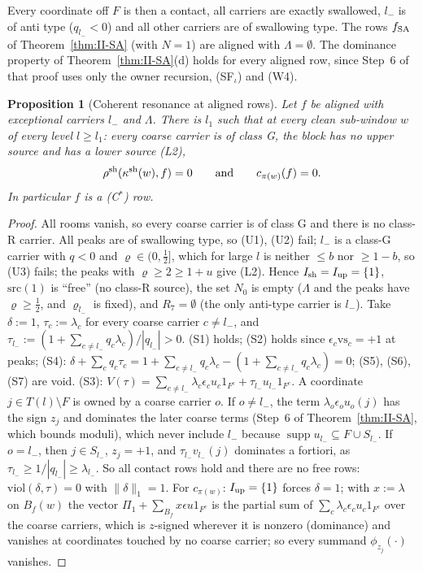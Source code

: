 \documentclass[10pt]{amsart}
\newtheorem{proposition}[theorem]{Proposition}
\theoremstyle{definition}
\theoremstyle{remark}
\newcommand{\supp}{\operatorname{supp}}
\begin{document}
Every coordinate off $F$ is then a contact, all carriers are exactly swallowed,
$l_-$ is of anti type ($q_{l_-}<0$) and all other carriers are of swallowing type.
The rows $f_{\rm SA}$ of Theorem~\ref{thm:II-SA} (with $N=1$) are aligned with
$\Lambda=\emptyset$.  The dominance property of Theorem~\ref{thm:II-SA}(d) holds for
every aligned row, since Step~6 of that proof uses only the owner recursion,
(SF$_\iota$) and (W4).

\begin{proposition}[Coherent resonance at aligned rows]\label{prop:II-alignedres}
Let $f$ be aligned with exceptional carriers $l_-$ and $\Lambda$.  There is $l_1$ such that
at every clean sub-window $w$ of every level $l\ge l_1$: every coarse carrier is of
class G, the block has no upper source and has a lower source \textup{(L2)},
\[
 \rho^{\rm sh}(\kappa^{\rm sh}(w),f)=0\qquad\text{and}\qquad c_{\pi(w)}(f)=0 .
\]
In particular $f$ is a \textup{(C$^*$)} row.
\end{proposition}

\begin{proof}
All rooms vanish, so every coarse carrier is of class G and there is no class-R
carrier.  All peaks are of swallowing type, so (U1), (U2) fail; $l_-$ is a class-G
carrier with $q<0$ and $\varrho\in(0,\frac12]$, which for large $l$ is neither $\le b$
nor $\ge1-b$, so (U3) fails; the peaks with $\varrho\ge2\ge1+u$ give (L2).  Hence
$I_{\rm sh}=I_{\rm up}=\{1\}$, $\mathrm{src}(1)$ is ``free'' (no class-R source), the
set $N_0$ is empty ($\Lambda$ and the peaks have $\varrho\ge\frac12$, and $\varrho_{l_-}$ is fixed),
and $R_7=\emptyset$ (the only anti-type carrier is $l_-$).  Take $\delta:=1$,
$\tau_c:=\lambda_c$ for every coarse carrier $c\ne l_-$, and $\tau_{l_-}:=(1+\sum_{c\ne l_-}
q_c\lambda_c)/|q_{l_-}|>0$.  (S1) holds; (S2) holds since $\epsilon_c\mathrm{vs}_c=+1$ at peaks;
(S4): $\delta+\sum_cq_c\tau_c=1+\sum_{c\ne l_-}q_c\lambda_c-(1+\sum_{c\ne l_-}q_c\lambda_c)=0$; (S5),
(S6), (S7) are void.  (S3): $V(\tau)=\sum_{c\ne l_-}\lambda_c\epsilon_cu_c1_{F^c}+\tau_{l_-}u_{l_-}
1_{F^c}$.  A coordinate $j\in T(l)\setminus F$ is owned by a coarse carrier $o$.  If $o\ne
l_-$, the term $\lambda_o\epsilon_ou_o(j)$ has the sign $z_j$ and dominates the later coarse
terms (Step~6 of Theorem~\ref{thm:II-SA}, which bounds moduli), which never include
$l_-$ because $\supp u_{l_-}\subseteq F\cup S_{l_-}$.  If $o=l_-$, then $j\in S_{l_-}$, $z_j=
+1$, and $\tau_{l_-}v_{l_-}(j)$ dominates a fortiori, as $\tau_{l_-}\ge1/|q_{l_-}|\ge\lambda_{l_-}$.
So all contact rows hold and there are no free rows: $\mathrm{viol}(\delta,\tau)=0$ with
$\|\delta\|_1=1$.  For $c_{\pi(w)}$: $I_{\rm up}=\{1\}$ forces $\delta=1$; with $x:=\lambda$ on
$B_f(w)$ the vector $\Pi_1+\sum_{B_f}x\epsilon u1_{F^c}$ is the partial sum of
$\sum_c\lambda_c\epsilon_cu_c1_{F^c}$ over the coarse carriers, which is $z$-signed wherever it
is nonzero (dominance) and vanishes at coordinates touched by no coarse carrier; so
every summand $\phi_{z_j}(\cdot)$ vanishes.
\end{proof}
\end{document}
